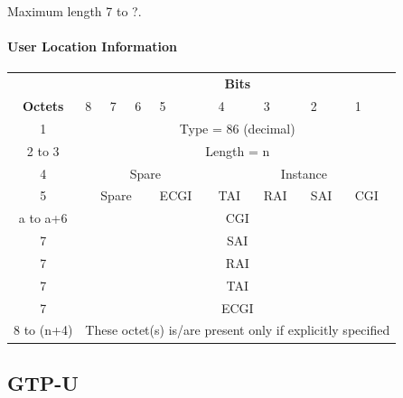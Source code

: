 Maximum length 7 to ?.


\paragraph{User Location Information}

\begin{center}
\begin{tabular}{c|p{1cm}|p{1cm}|p{1cm}|p{1cm}|p{1cm}|p{1cm}|p{1cm}|p{1cm}|}
\multicolumn{1}{c}{} & \multicolumn{8}{c}{\textbf{Bits}} \\
\cline{2-9} \textbf{Octets} & 8 & 7 & 6 & 5 & 4 & 3 & 2 & 1 \\ 
\cline{2-9} 1 & \multicolumn{8}{c|}{Type = 86 (decimal)} \\ 
\cline{2-9} 2 to 3 & \multicolumn{8}{c|}{Length = n}  \\ 
\cline{2-9} 4 & \multicolumn{4}{c|}{Spare} & \multicolumn{4}{c|}{Instance} \\ 
\cline{2-9} 5 & \multicolumn{3}{c|}{Spare} & ECGI & TAI & RAI & SAI & CGI \\ 
\cline{2-9} a to a+6 & \multicolumn{8}{c|}{CGI} \\ 
\cline{2-9} 7 & \multicolumn{8}{c|}{SAI} \\ 
\cline{2-9} 7 & \multicolumn{8}{c|}{RAI} \\ 
\cline{2-9} 7 & \multicolumn{8}{c|}{TAI} \\ 
\cline{2-9} 7 & \multicolumn{8}{c|}{ECGI} \\ 
\cline{2-9} 8 to (n+4) & \multicolumn{8}{c|}{These octet(s) is/are present only if explicitly specified} \\
\cline{2-9}
\end{tabular} 
\end{center}

\subsection{GTP-U}
